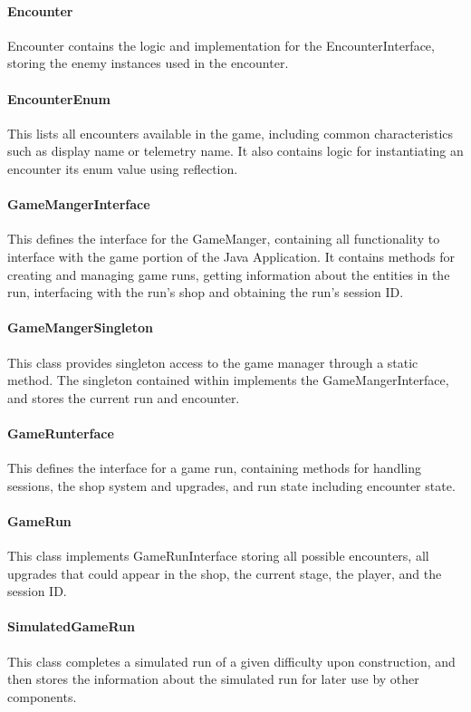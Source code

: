 \documentclass[11pt]{article}
\begin{document}
\paragraph{Encounter}
Encounter contains the logic and implementation for the EncounterInterface, storing the enemy instances used in the encounter. 

\paragraph{EncounterEnum}
This lists all encounters available in the game, including common characteristics such as display name or telemetry name. It also contains logic for instantiating an encounter its enum value using reflection.

\paragraph{GameMangerInterface}
This defines the interface for the GameManger, containing all functionality to interface with the game portion of the Java Application. It contains methods for creating and managing game runs, getting information about the entities in the run, interfacing with the run's shop and obtaining the run's session ID. 

\paragraph{GameMangerSingleton}
This class provides singleton access to the game manager through a static method. The singleton contained within implements the GameMangerInterface, and stores the current run and encounter. 

\paragraph{GameRunterface}
This defines the interface for a game run, containing methods for handling sessions, the shop system and upgrades, and run state including encounter state. 

\paragraph{GameRun}
This class implements GameRunInterface storing all possible encounters, all upgrades that could appear in the shop, the current stage, the player, and the session ID. 

\paragraph{SimulatedGameRun}
This class completes a simulated run of a given difficulty upon construction, and then stores the information about the simulated run for later use by other components. 
\end{document}
